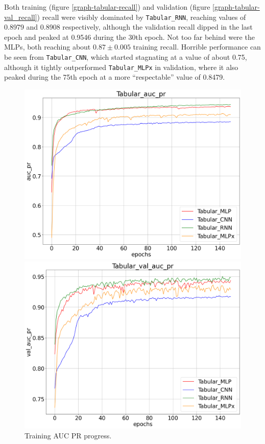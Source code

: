 Both training (figure \ref{graph-tabular-recall}) and validation (figure \ref{graph-tabular-val_recall}) recall were visibly
dominated by \texttt{Tabular\_RNN}, reaching
values of 0.8979 and 0.8908 respectively, although the validation recall dipped in the last epoch and
peaked at 0.9546 during the 30th epoch. Not too far behind were the MLPs, both reaching about $0.87 \pm 0.005$ training recall.
Horrible performance can be seen from \texttt{Tabular\_CNN}, which started stagnating at a value of about 0.75,
although it tightly outperformed \texttt{Tabular\_MLPx} in validation, where it also peaked during the 75th epoch
at a more ``respectable'' value of 0.8479.


\begin{figure}[!h]
    \centering
    \begin{minipage}{0.48\textwidth}
        \centering
        \includegraphics[width=\linewidth]{obrazky-figures/Tabular_experiment/auc_pr_2023-03-23_15:04:45.png}
        \caption{Training AUC PR progress.}
        \label{graph-tabular-auc-pr}
    \end{minipage}\hfill
    \begin{minipage}{0.48\textwidth}
        \centering
        \includegraphics[width=\linewidth]{obrazky-figures/Tabular_experiment/val_auc_pr_2023-03-23_15:04:46.png}

\end{minipage}
\end{figure}
